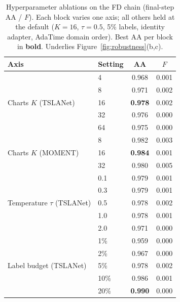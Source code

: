 \begin{table}[t]
\centering
\caption{Hyperparameter ablations on the FD chain (final-step AA / $F$).
Each block varies one axis; all others held at the default ($K{=}16$,
$\tau{=}0.5$, 5\% labels, identity adapter, AdaTime domain order). Best AA
per block in \textbf{bold}. Underlies Figure~\ref{fig:robustness}(b,c).}
\label{tab:hparams}
\small
\begin{tabular}{ll cc}
\toprule
Axis & Setting & AA & $F$\\
\midrule
\multirow{5}{*}{Charts $K$ (TSLANet)}
 & 4  & 0.968 & 0.001\\
 & 8  & 0.971 & 0.002\\
 & 16 & \textbf{0.978} & 0.002\\
 & 32 & 0.976 & 0.000\\
 & 64 & 0.975 & 0.000\\
\cmidrule(lr){1-4}
\multirow{3}{*}{Charts $K$ (MOMENT)}
 & 8  & 0.982 & 0.003\\
 & 16 & \textbf{0.984} & 0.001\\
 & 32 & 0.980 & 0.005\\
\cmidrule(lr){1-4}
\multirow{5}{*}{Temperature $\tau$ (TSLANet)}
 & 0.1 & 0.979 & 0.001\\
 & 0.3 & 0.979 & 0.001\\
 & 0.5 & 0.978 & 0.002\\
 & 1.0 & 0.978 & 0.001\\
 & 2.0 & 0.971 & 0.000\\
\cmidrule(lr){1-4}
\multirow{5}{*}{Label budget (TSLANet)}
 & 1\%  & 0.959 & 0.000\\
 & 2\%  & 0.967 & 0.000\\
 & 5\%  & 0.978 & 0.002\\
 & 10\% & 0.986 & 0.001\\
 & 20\% & \textbf{0.990} & 0.000\\

\end{tabular}
\end{table}
